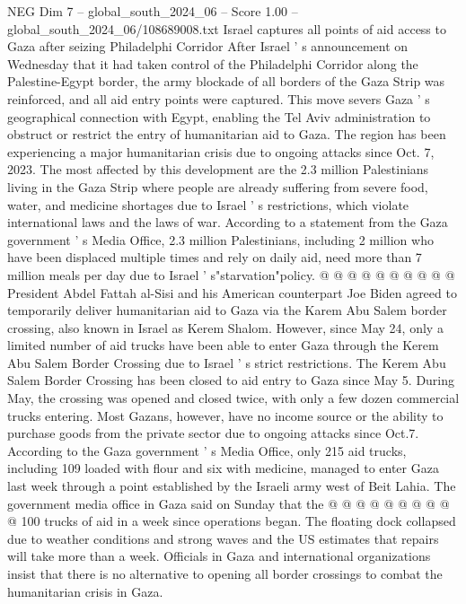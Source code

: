 \begin{textsample}{NEG Dim 7 – global\_south\_2024\_06 – Score 1.00 – global\_south\_2024\_06/108689008.txt}  \label{ex:f7_neg_218}
Israel captures all points of aid access to Gaza after seizing Philadelphi Corridor After Israel ' s announcement on Wednesday that it had taken control of the Philadelphi Corridor along the Palestine-Egypt border, the army blockade of all borders of the Gaza Strip was reinforced, and all aid entry points were captured.
This move severs Gaza ' s geographical connection with Egypt, enabling the Tel Aviv administration to obstruct or restrict the entry of humanitarian aid to Gaza.
The region has been experiencing a major humanitarian crisis due to ongoing attacks since Oct. 7, 2023.
The most affected by this development are the 2.3 million Palestinians living in the Gaza Strip where people are already suffering from severe food, water, and medicine shortages due to Israel ' s restrictions, which violate international laws and the laws of war.
According to a statement from the Gaza government ' s Media Office, 2.3 million Palestinians, including 2 million who have been displaced multiple times and rely on daily aid, need more than 7 million meals per day due to Israel ' s"starvation"policy. @ @ @ @ @ @ @ @ @ @ President Abdel Fattah al-Sisi and his American counterpart Joe Biden agreed to temporarily deliver humanitarian aid to Gaza via the Karem Abu Salem border crossing, also known in Israel as Kerem Shalom.
However, since May 24, only a limited number of aid trucks have been able to enter Gaza through the Kerem Abu Salem Border Crossing due to Israel ' s strict restrictions.
The Kerem Abu Salem Border Crossing has been closed to aid entry to Gaza since May 5.
During May, the crossing was opened and closed twice, with only a few dozen commercial trucks entering.
Most Gazans, however, have no income source or the ability to purchase goods from the private sector due to ongoing attacks since Oct.7.
According to the Gaza government ' s Media Office, only 215 aid trucks, including 109 loaded with flour and six with medicine, managed to enter Gaza last week through a point established by the Israeli army west of Beit Lahia.
The government media office in Gaza said on Sunday that the @ @ @ @ @ @ @ @ @ @ 100 trucks of aid in a week since operations began.
The floating dock collapsed due to weather conditions and strong waves and the US estimates that repairs will take more than a week.
Officials in Gaza and international organizations insist that there is no alternative to opening all border crossings to combat the humanitarian crisis in Gaza.

\end{textsample}
